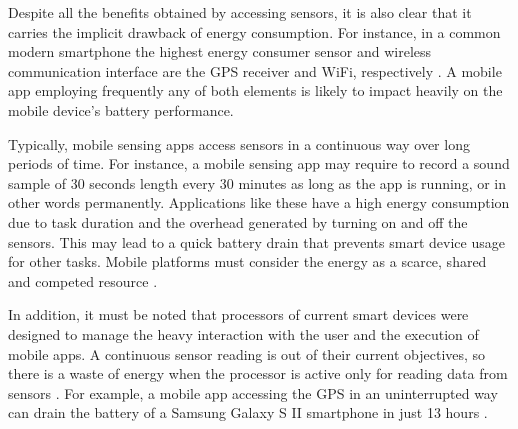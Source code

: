 \documentclass{report}
\begin{document}
Despite all the benefits obtained by accessing sensors, it is also clear that it carries the implicit drawback of energy consumption.
For instance, in a common modern smartphone the highest energy consumer sensor and wireless communication interface are the GPS receiver and WiFi, respectively \citep{Kjaergaard2012}.
A mobile app employing frequently any of both elements is likely to impact heavily on the mobile device's battery performance.



Typically, mobile sensing apps access sensors in a continuous way over long periods of time.
For instance, a mobile sensing app may require to record a sound sample of 30 seconds length every 30 minutes as long as the app is running, or in other words permanently.
Applications like these have a high energy consumption due to task duration and the overhead generated by turning on and off the sensors.
This may lead to a quick battery drain that prevents smart device usage for other tasks.
Mobile platforms must consider the energy as a scarce, shared and competed resource \citep{Perez-Torres2012}.

In addition, it must be noted that processors of current smart devices were designed to manage the heavy interaction with the user and the execution of mobile apps.
A continuous sensor reading is out of their current objectives, so there is a waste of energy when the processor is active only for reading data from sensors \citep{Priyantha2011}.
For example, a mobile app accessing the GPS in an uninterrupted way can drain the battery of a Samsung Galaxy S II smartphone in just 13 hours \citep{Perez-Torres2012}.

\end{document}
